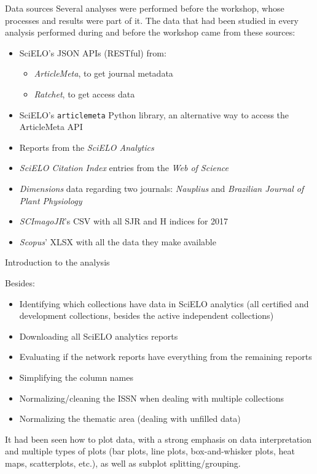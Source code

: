 \documentclass[utf8]{beamer}
\begin{document}
\begin{frame}{Data sources}
  Several analyses were performed before the workshop,
  whose processes and results were part of it.
  The data that had been studied in every analysis
  performed during and before the workshop came from
  these sources:

  \begin{itemize}
    \item SciELO's JSON APIs (RESTful) from:
    \begin{itemize}
      \item \emph{ArticleMeta}, to get journal metadata
      \item \emph{Ratchet}, to get access data
    \end{itemize}
    \item SciELO's \texttt{articlemeta} Python library,
          an alternative way to access the ArticleMeta API
    \item Reports from the \emph{SciELO Analytics}
    \item \emph{SciELO Citation Index} entries from
          the \emph{Web of Science}
    \item \emph{Dimensions} data regarding two journals:
          \emph{Nauplius} and
          \emph{Brazilian Journal of Plant Physiology}
    \item \emph{SCImagoJR}'s CSV with all SJR and H indices for 2017
    \item \emph{Scopus}' XLSX with all the data they make available
  \end{itemize}

\end{frame}


\begin{frame}{Introduction to the analysis}

  Besides:

  \begin{itemize}
    \item Identifying which collections have data in SciELO analytics
          (all certified and development collections,
           besides the active independent collections)
    \item Downloading all SciELO analytics reports
    \item Evaluating if the network reports
          have everything from the remaining reports
    \item Simplifying the column names
    \item Normalizing/cleaning the ISSN
          when dealing with multiple collections
    \item Normalizing the thematic area
          (dealing with unfilled data)
  \end{itemize}

  It had been seen how to plot data,
  with a strong emphasis on data interpretation
  and multiple types of plots
  (bar plots, line plots, box-and-whisker plots, heat maps,
   scatterplots, etc.),
  as well as subplot splitting/grouping.

\end{frame}
\end{document}
